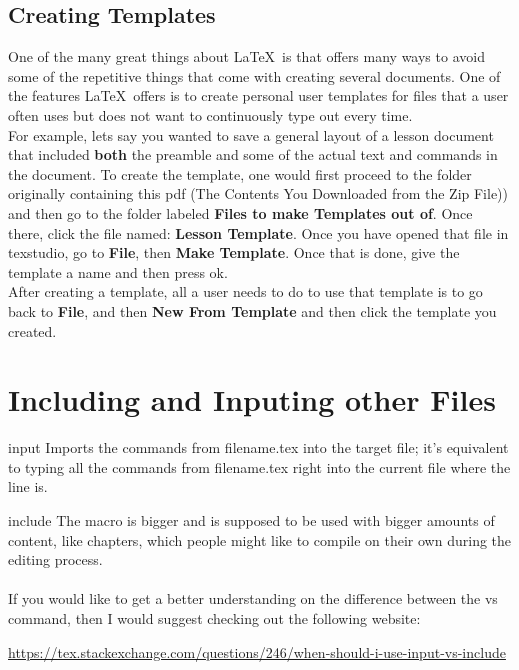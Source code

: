 \documentclass[12pt,hidelinks]{article}
\begin{document}
	\subsection{Creating Templates}
		One of the many great things about \LaTeX\ is that offers many ways to avoid some of the repetitive things that come with creating several documents. One of the features \LaTeX\ offers is to create personal user templates for files that a user often uses but does not want to continuously type out every time.\\
		For example, lets say you wanted to save a general layout of a lesson document that included \textbf{both} the preamble and some of the actual text and commands in the document. 
		To create the template, one would first proceed to the folder originally containing this pdf (The Contents You Downloaded from the Zip File)) and then go to the folder labeled \textbf{Files to make Templates out of}. Once there, click the file named: \textbf{Lesson Template}. Once you have opened that file in texstudio, go to \textbf{File}, then \textbf{Make Template}. Once that is done, give the template a name and then press ok.\\
		After creating a template, all a user needs to do to use that template is to go back to \textbf{File}, and then \textbf{New From Template} and then click the template you created.
	\vspace{-1.5mm}
\newpage
\section{Including and Inputing other Files}
\vspace{10.5cm}
	\begin{docCommand}{input}{}
		Imports the commands from filename.tex into the target file; it's equivalent to typing all the commands from filename.tex right into the current file where the  line is. 
	\end{docCommand}
	\begin{docCommand}{include}{}
		The  macro is bigger and is supposed to be used with bigger amounts of content, like chapters, which people might like to compile on their own during the editing process.
	\end{docCommand}
\paragraph{}If you would like to get a better understanding on the difference between the  vs  command, then I would suggest checking out the following website:
\begin{center}
\url{https://tex.stackexchange.com/questions/246/when-should-i-use-input-vs-include}    
\end{center}
\newpage
\end{document}
